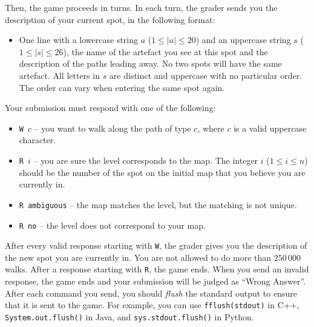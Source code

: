 Then, the game proceeds in turns. In each turn, the grader sends you the description of your current spot, in the following format:
\begin{itemize}
	\item One line with a lowercase string $a$ ($1 \le |a| \le 20$) and an uppercase string $s$ ($1 \le |s| \le 26$), the name of the artefact you see at this spot and the description of the paths leading away. No two spots will have the same artefact. All letters in $s$ are distinct and uppercase with no particular order. The order can vary when entering the same spot again.
\end{itemize}
Your submission must respond with one of the following:
\begin{itemize}
	\item \texttt{W} $\,c$ -- you want to walk along the path of type $c$, where $c$ is a valid uppercase character.
  \item \texttt{R} $\,i$ -- you are sure the level corresponds to the map. The integer \texttt{$i$} ($1\le i\le n$) should be the number of the spot on the initial map that you believe you are currently in.
	\item \texttt{R ambiguous} -- the map matches the level, but the matching is not unique.
	\item \texttt{R no} -- the level does not correspond to your map.
\end{itemize}

After every valid response starting with \texttt{W}, the grader gives you the description of the new spot you are currently in. You are not allowed to do more than $250\,000$ walks.
After a response starting with \texttt{R}, the game ends. When you send an invalid response, the game ends and your submission will be judged as ``Wrong Answer''.
After each command you send, you should \emph{flush} the standard
output to ensure that it is sent to the game. For example, you can
use \texttt{fflush(stdout)} in C++, \texttt{System.out.flush()} in
Java, and \texttt{sys.stdout.flush()} in Python.

